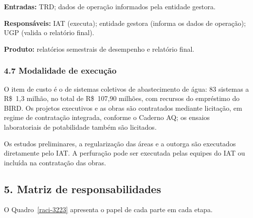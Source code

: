 \textbf{Entradas:} TRD; dados de operação informados pela entidade gestora.

\textbf{Responsáveis:} IAT (executa); entidade gestora (informa os dados de operação); UGP (valida o relatório final).

\textbf{Produto:} relatórios semestrais de desempenho e relatório final.

\subsubsection*{4.7 Modalidade de execução}

O item de custo é o de sistemas coletivos de abastecimento de água: 83 sistemas a R\$~1,3 milhão, no total de R\$~107,90 milhões, com recursos do empréstimo do BIRD. Os projetos executivos e as obras são contratados mediante licitação, em regime de contratação integrada, conforme o Caderno AQ; os ensaios laboratoriais de potabilidade também são licitados.

Os estudos preliminares, a regularização das áreas e a outorga são executados diretamente pelo IAT. A perfuração pode ser executada pelas equipes do IAT ou incluída na contratação das obras.


{}
\subsection*{5. Matriz de responsabilidades}

O Quadro~\ref{raci-3223} apresenta o papel de cada parte em cada etapa.

